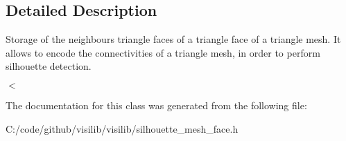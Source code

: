 \subsection{Detailed Description}
Storage of the neighbours triangle faces of a triangle face of a triangle mesh. It allows to encode the connectivities of a triangle mesh, in order to perform silhouette detection. 

$<$ 

The documentation for this class was generated from the following file\+:\begin{DoxyCompactItemize}
\item 
C\+:/code/github/visilib/visilib/silhouette\+\_\+mesh\+\_\+face.\+h\end{DoxyCompactItemize}
